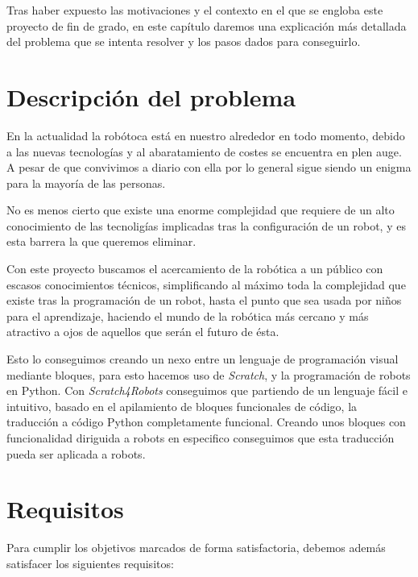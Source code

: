 Tras haber expuesto las motivaciones y el contexto en el que se engloba este proyecto de fin de grado, en este capítulo daremos una explicación más detallada del problema que se
intenta resolver y los pasos dados para conseguirlo.


\section{Descripción del problema}
\label{sec:descripcion del problema}

En la actualidad la robótoca está en nuestro alrededor en todo momento, debido a las nuevas tecnologías y al abaratamiento de costes se encuentra en plen auge. A pesar de que convivimos a diario con ella por lo general sigue siendo un enigma para la mayoría de las personas.

No es menos cierto que existe una enorme complejidad que requiere de un alto conocimiento de las tecnoligías implicadas tras la configuración de un robot, y es esta barrera la que queremos eliminar.

Con este proyecto buscamos el acercamiento de la robótica a un público con escasos conocimientos técnicos, simplificando al máximo toda la complejidad que existe tras la programación de un robot, hasta el punto que sea usada por niños para el aprendizaje, haciendo el mundo de la robótica más cercano y más atractivo a ojos de aquellos que serán el futuro de ésta.

Esto lo conseguimos creando un nexo entre un lenguaje de programación visual mediante bloques, para esto hacemos uso de \textit{Scratch}, y la programación de robots en Python. Con \textit{Scratch4Robots} conseguimos que partiendo de un lenguaje fácil e intuitivo, basado en el apilamiento de bloques funcionales de código, la traducción a código Python completamente funcional. Creando unos bloques con funcionalidad diriguida a robots en especifico conseguimos que esta traducción pueda ser aplicada a robots.    

\section{Requisitos}
\label{sec:requisitos}

Para cumplir los objetivos marcados de forma satisfactoria, debemos además satisfacer
los siguientes requisitos:


